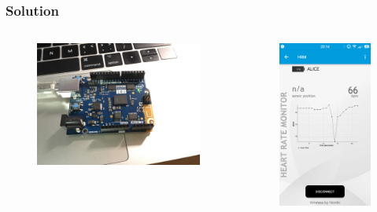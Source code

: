 \documentclass[UTF8]{ctexbeamer}
\begin{document}
\begin{frame}
  \frametitle{Solution}
   \begin{columns}
  \begin{figure}
    \includegraphics[width=0.9\linewidth]{arduino101.jpg}
  \end{figure}
  \begin{figure}
    \includegraphics[width=0.6\linewidth]{line.png}
  \end{figure}
  \end{columns}
\end{frame}
\end{document}
